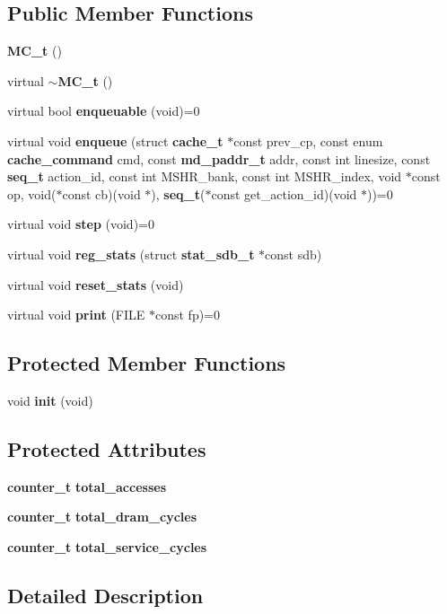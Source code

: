 \subsection*{Public Member Functions}
\begin{CompactItemize}
\item 
{\bf MC\_\-t} ()
\item 
virtual {\bf $\sim$MC\_\-t} ()
\item 
virtual bool {\bf enqueuable} (void)=0
\item 
virtual void {\bf enqueue} (struct {\bf cache\_\-t} $\ast$const prev\_\-cp, const enum {\bf cache\_\-command} cmd, const {\bf md\_\-paddr\_\-t} addr, const int linesize, const {\bf seq\_\-t} action\_\-id, const int MSHR\_\-bank, const int MSHR\_\-index, void $\ast$const op, void($\ast$const cb)(void $\ast$), {\bf seq\_\-t}($\ast$const get\_\-action\_\-id)(void $\ast$))=0
\item 
virtual void {\bf step} (void)=0
\item 
virtual void {\bf reg\_\-stats} (struct {\bf stat\_\-sdb\_\-t} $\ast$const sdb)
\item 
virtual void {\bf reset\_\-stats} (void)
\item 
virtual void {\bf print} (FILE $\ast$const fp)=0
\end{CompactItemize}
\subsection*{Protected Member Functions}
\begin{CompactItemize}
\item 
void {\bf init} (void)
\end{CompactItemize}
\subsection*{Protected Attributes}
\begin{CompactItemize}
\item 
{\bf counter\_\-t} {\bf total\_\-accesses}
\item 
{\bf counter\_\-t} {\bf total\_\-dram\_\-cycles}
\item 
{\bf counter\_\-t} {\bf total\_\-service\_\-cycles}
\end{CompactItemize}


\subsection{Detailed Description}


